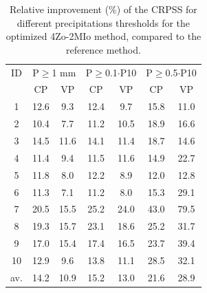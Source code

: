 \documentclass[review]{elsarticle}
\begin{document}
\begin{table}[t]
	\caption{Relative improvement (\%) of the CRPSS for different precipitations thresholds for the optimized 4Zo-2MIo method, compared to the reference method.}
	\footnotesize
	\begin{center}
		\begin{tabular}{ccccccc}
			\hline 
			ID & \multicolumn{2}{c}{P\(\geq\)1 mm} & \multicolumn{2}{c}{P\(\geq\)0.1\(\cdot\)P10} & \multicolumn{2}{c}{P\(\geq\)0.5\(\cdot\)P10} \\  
			& CP & VP & CP & VP & CP & VP \\ 
			\hline 
			1 & 12.6 & 9.3 & 12.4 & 9.7 & 15.8 & 11.0 \\
			2 & 10.4 & 7.7 & 11.2 & 10.5 & 18.9 & 16.6 \\ 
			3 & 14.5 & 11.6 & 14.1 & 11.4 & 18.7 & 14.6 \\ 
			4 & 11.4 & 9.4 & 11.5 & 11.6 & 14.9 & 22.7 \\ 
			5 & 11.8 & 8.0 & 12.2 & 8.9 & 12.0 & 12.8 \\ 
			6 & 11.3 & 7.1 & 11.2 & 8.0 & 15.3 & 29.1 \\ 
			7 & 20.5 & 15.5 & 25.2 & 24.0 & 43.0 & 79.5 \\
			8 & 19.3 & 15.7 & 23.1 & 18.6 & 25.2 & 31.7 \\ 
			9 & 17.0 & 15.4 & 17.4 & 16.5 & 23.7 & 39.4 \\ 
			10 & 12.9 & 9.6 & 13.8 & 11.1 & 28.5 & 32.1 \\ 
			\hline 
			av. & 14.2 & 10.9 & 15.2 & 13.0 & 21.6 & 28.9 \\ 
			\hline 
		\end{tabular} 
	\end{center}
	\label{table:scores_thresholds_4Zo-2MIo}
\end{table}
\end{document}
